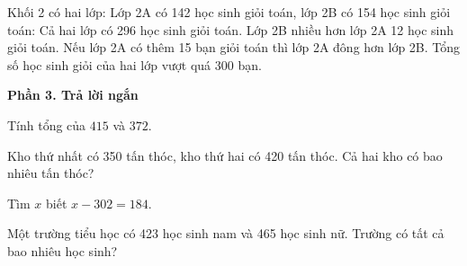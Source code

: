 \begin{ex} %
Khối 2 có hai lớp: Lớp 2A có 142 học sinh giỏi toán, lớp 2B có 154 học sinh giỏi toán:
\choiceTF
{\True Cả hai lớp có 296 học sinh giỏi toán.}
{\True Lớp 2B nhiều hơn lớp 2A 12 học sinh giỏi toán.}
{Nếu lớp 2A có thêm 15 bạn giỏi toán thì lớp 2A đông hơn lớp 2B.}
{Tổng số học sinh giỏi của hai lớp vượt quá 300 bạn.}
\end{ex}

\textbf{Phần 3. Trả lời ngắn}

\begin{ex} %
Tính tổng của $415$ và $372$.
\end{ex}

\begin{ex} %
Kho thứ nhất có 350 tấn thóc, kho thứ hai có 420 tấn thóc. Cả hai kho có bao nhiêu tấn thóc?
\end{ex}

\begin{ex} %
Tìm $x$ biết $x - 302 = 184$.
\end{ex}

\begin{ex} %
Một trường tiểu học có 423 học sinh nam và 465 học sinh nữ. Trường có tất cả bao nhiêu học sinh?
\end{ex}

